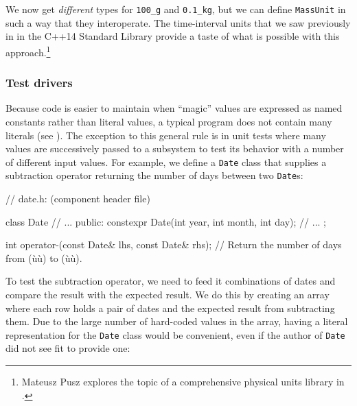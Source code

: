 \noindent We now get \emph{different} types for \lstinline!100_g! and
\lstinline!0.1_kg!, but we can define \lstinline!MassUnit! in such a way that
they interoperate. The time-interval units that we saw previously in
{ in the C++14 Standard Library} provide a taste of what is
possible with this approach.{\cprotect\footnote{Mateusz Pusz explores
the topic of a comprehensive physical units library in \cite{pusz20b}.}}

\subsubsection[Test drivers]{Test drivers}\label{test-drivers}

Because code is easier to maintain when ``magic'' values are expressed
as named constants rather than literal values, a typical program does
not contain many literals (see ). The
exception to this general rule is in unit tests where many values are
successively passed to a subsystem to test its behavior with a number of
different input values. For example, we define a \lstinline!Date! class
that supplies a subtraction operator returning the number of days
between two \lstinline!Date!s:

\begin{emcppslisting}[emcppsbatch=e21]
// date.h: (component header file)

class Date
{
    // ...
public:
    constexpr Date(int year, int month, int day);
    // ...
};

int operator-(const Date& lhs, const Date& rhs);
    // Return the number of days from (ù{}ù) to (ù{}ù).
\end{emcppslisting}
    
\noindent To test the subtraction operator, we need to feed it combinations of
dates and compare the result with the expected result. We do this by
creating an array where each row holds a pair of dates and the expected
result from subtracting them. Due to the large number of hard-coded
values in the array, having a literal representation for the
\lstinline!Date! class would be convenient, even if the author of
\lstinline!Date! did not see fit to provide one:

